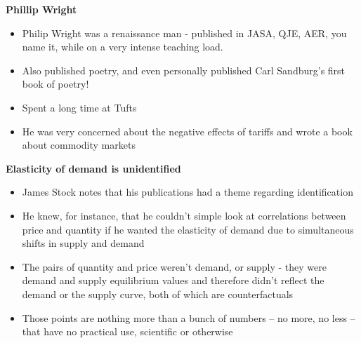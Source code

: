 \documentclass[notes=show]{beamer}
\begin{document}
\begin{frame}[plain]

	\begin{center}
	\textbf{Phillip Wright}
	\end{center}
	
	\begin{itemize}
	\item Philip Wright was a renaissance man - published in JASA, QJE, AER, you name it, while on a very intense teaching load. 
	\item Also published poetry, and even personally published Carl Sandburg's first book of poetry!
	\item Spent a long time at Tufts
	\item He was very concerned about the negative effects of tariffs and wrote a book about commodity markets
	\end{itemize}

\end{frame}

\begin{frame}[plain]
	\begin{center}
	\textbf{Elasticity of demand is unidentified}
	\end{center}
	
	\begin{itemize}
	\item James Stock notes that his publications had a theme regarding identification
	\item He knew, for instance, that he couldn't simple look at correlations between price and quantity if he wanted the elasticity of demand due to simultaneous shifts in supply and demand
	\item The pairs of quantity and price weren't demand, or supply - they were demand and supply equilibrium values and therefore didn't reflect the demand or the supply curve, both of which are counterfactuals
	\item Those points are nothing more than a bunch of numbers -- no more, no less -- that have no practical use, scientific or otherwise
	\end{itemize}
	
\end{frame}
\end{document}

